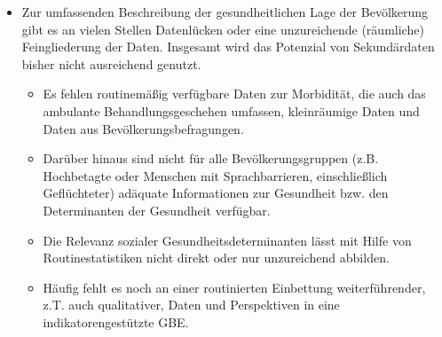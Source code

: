 \documentclass{article}
\begin{document}
\begin{itemize}
\item Zur umfassenden Beschreibung der gesundheitlichen Lage der Bevölkerung gibt es an vielen Stellen Datenlücken oder eine unzureichende (räumliche) Feingliederung der Daten. Insgesamt wird das Potenzial von Sekundärdaten bisher nicht ausreichend genutzt.

\begin{itemize}
\item Es fehlen routinemäßig verfügbare Daten zur Morbidität, die auch das ambulante Behandlungsgeschehen umfassen, kleinräumige Daten und Daten aus Bevölkerungsbefragungen.


\end{itemize}
\begin{itemize}
\item Darüber hinaus sind nicht für alle Bevölkerungsgruppen (z.B. Hochbetagte oder Menschen mit Sprachbarrieren, einschließlich Geflüchteter) adäquate Informationen zur Gesundheit bzw. den Determinanten der Gesundheit verfügbar.


\end{itemize}
\begin{itemize}
\item Die Relevanz sozialer Gesundheitsdeterminanten lässt mit Hilfe von Routinestatistiken nicht direkt oder nur unzureichend abbilden.


\end{itemize}
\begin{itemize}
\item Häufig fehlt es noch an einer routinierten Einbettung weiterführender, z.T. auch qualitativer, Daten und Perspektiven in eine indikatorengestützte GBE.


\end{itemize}

\end{itemize}
\end{document}
